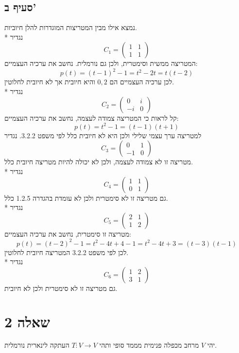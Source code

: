 \subsection{סעיף ב'}
נמצא אילו מבין המטריצות המוגדרות להלן חיוביות. \\*
נגדיר
\[
	C_1 = \begin{pmatrix}
		1 & 1 \\
		1 & 1
	\end{pmatrix}
\]
המטריצה ממשית וסימטרית, ולכן גם נורמלית. נחשב את ערכיה העצמיים:
\[
	p(t) = {(t - 1)}^2 - 1 = t^2 - 2t = t(t - 2)
\]
לכן ערכיה העצמיים הם $0, 2$ והיא חיובית אך לא חיובית לחלוטין. \\*
נגדיר
\[
	C_2 = \begin{pmatrix}
		0 & i \\
		-i & 0
	\end{pmatrix}
\]
קל לראות כי המטריצה צמודה לעצמה, נחשב את ערכיה העצמיים:
\[
	p(t) = t^2 - 1 = (t - 1)(t + 1)
\]
למטריצה ערך עצמי שלילי ולכן היא לא חיובית כלל לפי משפט 3.2.2.
נגדיר
\[
	C_3 = \begin{pmatrix}
		0 & 1 \\
		-1 & 0
	\end{pmatrix}
\]
מטריצה זו לא צמודה לעצמה, ולכן לא יכולה להיות מטריצה חיובית כלל. \\*
נגדיר
\[
	C_4 = \begin{pmatrix}
		1 & 1 \\
		0 & 1
	\end{pmatrix}
\]
גם מטריצה זו לא סימטרית ולכן לא עומדת בהגדרה 1.2.5 כלל. \\*
נגדיר
\[
	C_5 = \begin{pmatrix}
		2 & 1 \\
		1 & 2
	\end{pmatrix}
\]
מטריצה זו סימטרית, נחשב את ערכיה העצמיים:
\[
	p(t) = {(t - 2)}^2 - 1 = t^2 - 4t + 4 - 1 = t^2 - 4t + 3 = (t - 3)(t - 1)
\]
לכן לפי משפט 3.2.2 המטריצה חיובית לחלוטין. \\*
נגדיר
\[
	C_6 = \begin{pmatrix}
		1 & 2 \\
		3 & 1
	\end{pmatrix}
\]
גם מטריצה זו לא סימטרית ולכן לא חיובית.

\section{שאלה 2}
יהי $V$ מרחב מכפלה פנימית מממד סופי ותהי $T: V \to V$ העתקה לינארית נורמלית.
